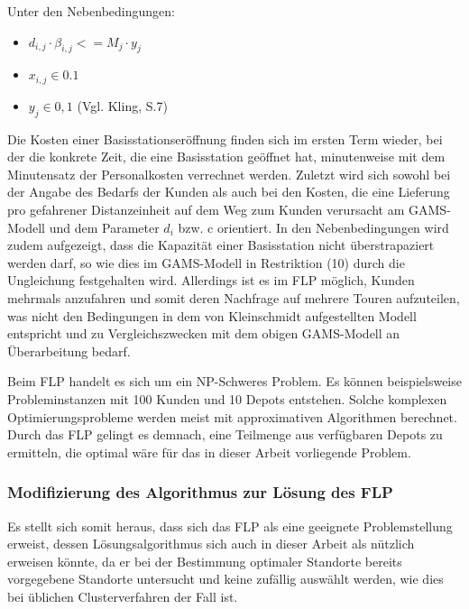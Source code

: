 \documentclass[a4paper,12pt,parskip,bibtotoc,liststotoc]{article}
\begin{document}
Unter den Nebenbedingungen:
\begin{center}
\begin{itemize}

\item $d_{i,j}\cdot \beta_{i,j} <= M_{j}\cdot y_{j}$

\item $x_{i,j} \in {0.1}$

\item $y_{j} \in {0,1}$ (Vgl. Kling, S.7)
\end{itemize}
\end{center}


Die Kosten einer Basisstationseröffnung finden sich im ersten Term wieder, bei der die konkrete Zeit, die eine Basisstation geöffnet hat, minutenweise mit dem Minutensatz der Personalkosten verrechnet werden.
Zuletzt wird sich sowohl bei der Angabe des Bedarfs der Kunden als auch bei den Kosten, die eine Lieferung pro gefahrener Distanzeinheit auf dem Weg zum Kunden verursacht am GAMS-Modell und dem Parameter $d_{i}$ bzw. c orientiert.
In den Nebenbedingungen wird zudem aufgezeigt, dass die Kapazität einer Basisstation nicht überstrapaziert werden darf, so wie dies im GAMS-Modell in Restriktion (10) durch die Ungleichung festgehalten wird.
Allerdings ist es im FLP möglich, Kunden mehrmals anzufahren und somit deren Nachfrage auf mehrere Touren aufzuteilen, was nicht den Bedingungen in dem von Kleinschmidt aufgestellten Modell entspricht und zu Vergleichszwecken mit dem obigen GAMS-Modell an Überarbeitung bedarf.

Beim FLP handelt es sich um ein NP-Schweres Problem. 
Es können beispielsweise Probleminstanzen mit 100 Kunden und 10 Depots entstehen. 
Solche komplexen Optimierungsprobleme werden meist mit approximativen Algorithmen berechnet.
Durch das FLP gelingt es demnach, eine Teilmenge aus verfügbaren Depots zu ermitteln, die optimal wäre für das in dieser Arbeit vorliegende Problem. 

 


\subsubsection{Modifizierung des Algorithmus zur Lösung des FLP}

Es stellt sich somit heraus, dass sich das FLP als eine geeignete Problemstellung erweist, dessen Lösungsalgorithmus sich auch in dieser Arbeit als nützlich erweisen könnte, da er bei der Bestimmung optimaler Standorte bereits vorgegebene Standorte untersucht und keine zufällig auswählt werden, wie dies bei üblichen Clusterverfahren der Fall ist.
\end{document}
